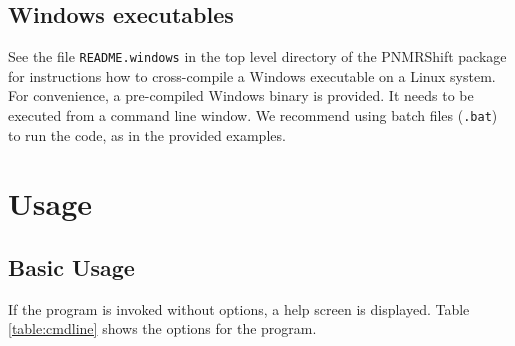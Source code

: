 \documentclass[11pt]{report}
\newcommand\PNMRShift{\textsf{PNMRShift}\xspace}
\begin{document}
\subsection{Windows executables}

 See the file \texttt{README.windows} in the top
level directory of the \PNMRShift package for instructions how to
cross-compile a Windows executable on a Linux system. For
convenience, a pre-compiled Windows binary is provided. It needs
to be executed from a command line window. We recommend using batch
files (\texttt{.bat}) to run the code, as in the provided examples. 

\section{Usage}
\subsection{Basic Usage}

If the program is invoked without options, a help screen is displayed. Table
\ref{table:cmdline} shows the options for the program.
\end{document}

